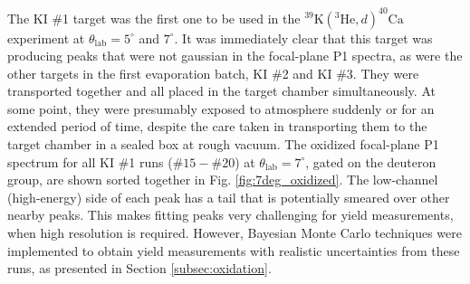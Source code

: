 The KI $\#$1 target was the first one to be used in the $^{39}\mathrm{K}(^{3}\mathrm{He}, d)^{40}\mathrm{Ca}$ experiment at $\theta_{\mathrm{lab}} = 5^{\circ}$ and $7^{\circ}$. It was immediately clear that this target was producing peaks that were not gaussian in the focal-plane P1 spectra, as were the other targets in the first evaporation batch, KI $\#$2 and KI $\#$3. They were transported together and all placed in the target chamber simultaneously. At some point, they were presumably exposed to atmosphere suddenly or for an extended period of time, despite the care taken in transporting them to the target chamber in a sealed box at rough vacuum. The oxidized focal-plane P1 spectrum for all KI $\#$1 runs ($\#15-\#20$) at $\theta_{\mathrm{lab}} = 7^{\circ}$, gated on the deuteron group, are shown sorted together in Fig. \ref{fig:7deg_oxidized}. The low-channel (high-energy) side of each peak has a tail that is potentially smeared over other nearby peaks. This makes fitting peaks very challenging for yield measurements, when high resolution is required. However, Bayesian Monte Carlo techniques were implemented to obtain yield measurements with realistic uncertainties from these runs, as presented in Section \ref{subsec:oxidation}.

\def\yTS{0.69}
\def\xTS{1.945}

